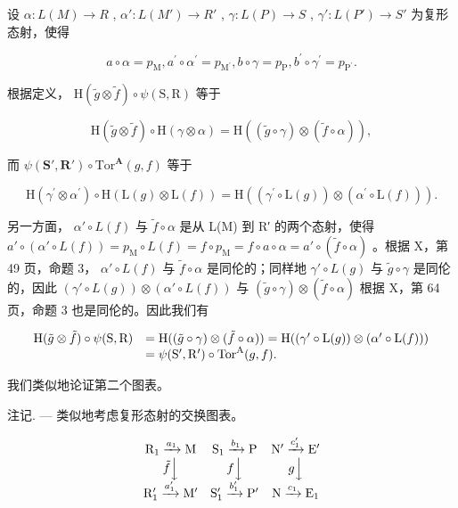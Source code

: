 设 \(\alpha: L(M) \to R\) , \(\alpha': L(M') \to R'\) , \(\gamma: L(P) \to S\) , \(\gamma': L(P') \to S'\) 为复形态射，使得

\[
a \circ \alpha = p _ {\mathrm{M}}, a ^ {\prime} \circ \alpha^ {\prime} = p _ {\mathrm {M^ {\prime}}}, b \circ \gamma = p _ {\mathrm{P}}, b ^ {\prime} \circ \gamma^ {\prime} = p _ {\mathrm {P^ {\prime}}}.
\]

根据定义， \(\mathrm{H}(\tilde{g}\otimes\tilde{f})\circ\psi(\mathrm{S},\mathrm{R})\) 等于

\[
\mathrm{H} (\tilde {g} \otimes \tilde {f}) \circ \mathrm{H} (\gamma \otimes \alpha) = \mathrm{H} ((\tilde {g} \circ \gamma) \otimes (\tilde {f} \circ \alpha)),
\]

而 \(\psi(\mathbf{S}',\mathbf{R}')\circ\mathrm{Tor}^{\mathbf{A}}(g,f)\) 等于

\[
\mathrm{H} \left(\gamma^ {\prime} \otimes \alpha^ {\prime}\right) \circ \mathrm{H} \left(\mathrm{L} (g) \otimes \mathrm{L} (f)\right) = \mathrm{H} \left(\left(\gamma^ {\prime} \circ \mathrm{L} (g)\right) \otimes \left(\alpha^ {\prime} \circ \mathrm{L} (f)\right)\right).
\]

另一方面， \(\alpha' \circ L(f)\) 与 \(\tilde{f} \circ \alpha\) 是从 L(M) 到 R′ 的两个态射，使得 \(a' \circ (\alpha' \circ L(f)) = p_{\mathrm{M}} \circ L(f) = f \circ p_{\mathrm{M}} = f \circ a \circ \alpha = a' \circ (\tilde{f} \circ \alpha)\) 。根据 X，第 49 页，命题 3， \(\alpha' \circ L(f)\) 与 \(\tilde{f} \circ \alpha\) 是同伦的；同样地 \(\gamma' \circ L(g)\) 与 \(\tilde{g} \circ \gamma\) 是同伦的，因此 \((\gamma' \circ L(g)) \otimes (\alpha' \circ L(f))\) 与 \((\tilde{g} \circ \gamma) \otimes (\tilde{f} \circ \alpha)\) 根据 X，第 64 页，命题 3 也是同伦的。因此我们有

\[
\begin{array}{r l} \mathrm{H} (\tilde {g} \otimes \tilde {f}) \circ \psi (\mathrm{S}, \mathrm{R}) & = \mathrm{H} ((\tilde {g} \circ \gamma) \otimes (\tilde {f} \circ \alpha)) = \mathrm{H} ((\gamma^ {\prime} \circ \mathrm{L} (g)) \otimes (\alpha^ {\prime} \circ \mathrm{L} (f))) \\ & = \psi (\mathrm{S} ^ {\prime}, \mathrm{R} ^ {\prime}) \circ \mathrm{Tor} ^ {\mathrm{A}} (g, f). \end{array}
\]

我们类似地论证第二个图表。

注记. --- 类似地考虑复形态射的交换图表。

\[
\begin{array}{c c c} \mathrm{R} _ {1} \xrightarrow {a _ {1}} \mathrm{M} & \mathrm{S} _ {1} \xrightarrow {b _ {1}} \mathrm{P} & \mathrm{N} ^ {\prime} \xrightarrow {c _ {1} ^ {\prime}} \mathrm{E} ^ {\prime} \\ \tilde {f} \Big \downarrow & f \Big \downarrow & g \Big \downarrow \\ \mathrm{R} _ {1} ^ {\prime} \xrightarrow {a _ {1} ^ {\prime}} \mathrm{M} ^ {\prime} & \mathrm{S} _ {1} ^ {\prime} \xrightarrow {b _ {1} ^ {\prime}} \mathrm{P} ^ {\prime} & \mathrm{N} \xrightarrow {c _ {1}} \mathrm{E} _ {1} \end{array}
\]

